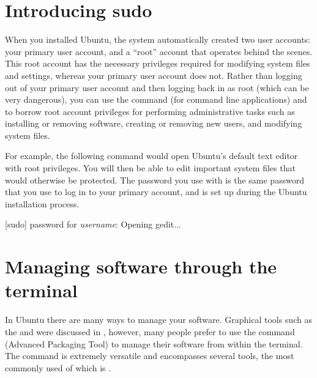 \section{Introducing sudo}

When you installed Ubuntu, the system automatically created two user accounts: your primary user account, and a ``root'' account that operates behind the scenes. This root account has the necessary privileges required for modifying system files and settings, whereas your primary user account does not. Rather than logging out of your primary user account and then logging back in as root (which can be very dangerous), you can use the  command (for command line applications) and  to borrow root account privileges for performing administrative tasks such as installing or removing software, creating or removing new users, and modifying system files. 

For example, the following command would open Ubuntu's default text editor  with root privileges. You will then be able to edit important system files that would otherwise be protected. The password you use with  is the same password that you use to log in to your primary account, and is set up during the Ubuntu installation process.

\begin{terminal}
\prompt {}
[sudo] password for \emph{username}:
Opening gedit...
\end{terminal}


\section{Managing software through the terminal}

In Ubuntu there are many ways to manage your software. Graphical
tools such as the  and  were discussed in , however,
many people prefer to use the  command (Advanced Packaging
Tool) to manage their software from within the terminal. The  command is
extremely versatile and encompasses several tools, the most commonly
used of which is .

